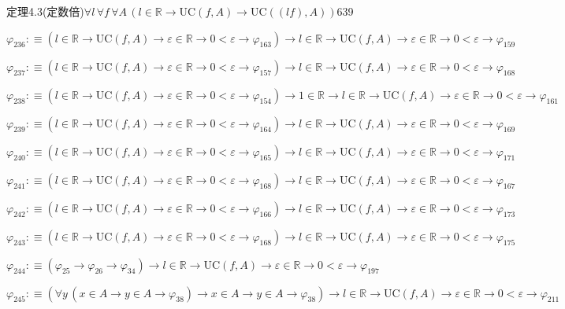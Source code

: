 \begin{fullproof}{定理4.3(定数倍)}{$\forall l\,\forall f\,\forall A\,(l \in \mathbb{R} \to \mathrm{UC}(f,A) \to \mathrm{UC}((l f),A))$}{639}
\begin{abbrevlist}
\item $\varphi_{236} :\equiv (l \in \mathbb{R} \to \mathrm{UC}(f,A) \to \varepsilon \in \mathbb{R} \to 0 < \varepsilon \to \varphi_{163}) \to l \in \mathbb{R} \to \mathrm{UC}(f,A) \to \varepsilon \in \mathbb{R} \to 0 < \varepsilon \to \varphi_{159}$
\item $\varphi_{237} :\equiv (l \in \mathbb{R} \to \mathrm{UC}(f,A) \to \varepsilon \in \mathbb{R} \to 0 < \varepsilon \to \varphi_{157}) \to l \in \mathbb{R} \to \mathrm{UC}(f,A) \to \varepsilon \in \mathbb{R} \to 0 < \varepsilon \to \varphi_{168}$
\item $\varphi_{238} :\equiv (l \in \mathbb{R} \to \mathrm{UC}(f,A) \to \varepsilon \in \mathbb{R} \to 0 < \varepsilon \to \varphi_{154}) \to 1 \in \mathbb{R} \to l \in \mathbb{R} \to \mathrm{UC}(f,A) \to \varepsilon \in \mathbb{R} \to 0 < \varepsilon \to \varphi_{161}$
\item $\varphi_{239} :\equiv (l \in \mathbb{R} \to \mathrm{UC}(f,A) \to \varepsilon \in \mathbb{R} \to 0 < \varepsilon \to \varphi_{164}) \to l \in \mathbb{R} \to \mathrm{UC}(f,A) \to \varepsilon \in \mathbb{R} \to 0 < \varepsilon \to \varphi_{169}$
\item $\varphi_{240} :\equiv (l \in \mathbb{R} \to \mathrm{UC}(f,A) \to \varepsilon \in \mathbb{R} \to 0 < \varepsilon \to \varphi_{165}) \to l \in \mathbb{R} \to \mathrm{UC}(f,A) \to \varepsilon \in \mathbb{R} \to 0 < \varepsilon \to \varphi_{171}$
\item $\varphi_{241} :\equiv (l \in \mathbb{R} \to \mathrm{UC}(f,A) \to \varepsilon \in \mathbb{R} \to 0 < \varepsilon \to \varphi_{168}) \to l \in \mathbb{R} \to \mathrm{UC}(f,A) \to \varepsilon \in \mathbb{R} \to 0 < \varepsilon \to \varphi_{167}$
\item $\varphi_{242} :\equiv (l \in \mathbb{R} \to \mathrm{UC}(f,A) \to \varepsilon \in \mathbb{R} \to 0 < \varepsilon \to \varphi_{166}) \to l \in \mathbb{R} \to \mathrm{UC}(f,A) \to \varepsilon \in \mathbb{R} \to 0 < \varepsilon \to \varphi_{173}$
\item $\varphi_{243} :\equiv (l \in \mathbb{R} \to \mathrm{UC}(f,A) \to \varepsilon \in \mathbb{R} \to 0 < \varepsilon \to \varphi_{168}) \to l \in \mathbb{R} \to \mathrm{UC}(f,A) \to \varepsilon \in \mathbb{R} \to 0 < \varepsilon \to \varphi_{175}$
\item $\varphi_{244} :\equiv (\varphi_{25} \to \varphi_{26} \to \varphi_{34}) \to l \in \mathbb{R} \to \mathrm{UC}(f,A) \to \varepsilon \in \mathbb{R} \to 0 < \varepsilon \to \varphi_{197}$
\item $\varphi_{245} :\equiv (\forall y\,(x \in A \to y \in A \to \varphi_{38}) \to x \in A \to y \in A \to \varphi_{38}) \to l \in \mathbb{R} \to \mathrm{UC}(f,A) \to \varepsilon \in \mathbb{R} \to 0 < \varepsilon \to \varphi_{211}$

\end{abbrevlist}
\end{fullproof}
